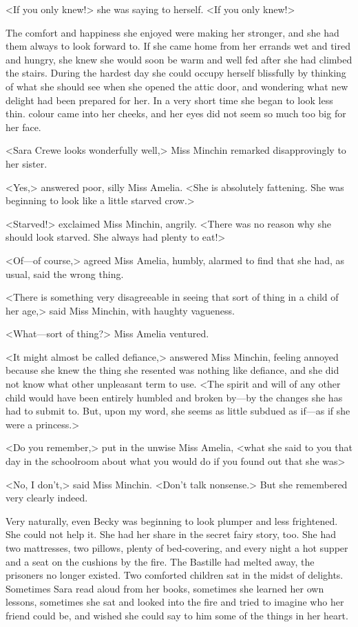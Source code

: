 <If you only knew!> she was saying to herself. <If you only knew!>

The comfort and happiness she enjoyed were making her stronger, and she had them always to look forward to. If she came home from her errands wet and tired and hungry, she knew she would soon be warm and well fed after she had climbed the stairs. During the hardest day she could occupy herself blissfully by thinking of what she should see when she opened the attic door, and wondering what new delight had been prepared for her. In a very short time she began to look less thin. colour came into her cheeks, and her eyes did not seem so much too big for her face.

<Sara Crewe looks wonderfully well,> Miss Minchin remarked disapprovingly to her sister.

<Yes,> answered poor, silly Miss Amelia. <She is absolutely fattening. She was beginning to look like a little starved crow.>

<Starved!> exclaimed Miss Minchin, angrily. <There was no reason why she should look starved. She always had plenty to eat!>

<Of—of course,> agreed Miss Amelia, humbly, alarmed to find that she had, as usual, said the wrong thing.

<There is something very disagreeable in seeing that sort of thing in a child of her age,> said Miss Minchin, with haughty vagueness.

<What—sort of thing?> Miss Amelia ventured.

<It might almost be called defiance,> answered Miss Minchin, feeling annoyed because she knew the thing she resented was nothing like defiance, and she did not know what other unpleasant term to use. <The spirit and will of any other child would have been entirely humbled and broken by—by the changes she has had to submit to. But, upon my word, she seems as little subdued as if—as if she were a princess.>

<Do you remember,> put in the unwise Miss Amelia, <what she said to you that day in the schoolroom about what you would do if you found out that she was\longdash>

<No, I don't,> said Miss Minchin. <Don't talk nonsense.> But she remembered very clearly indeed.

Very naturally, even Becky was beginning to look plumper and less frightened. She could not help it. She had her share in the secret fairy story, too. She had two mattresses, two pillows, plenty of bed-covering, and every night a hot supper and a seat on the cushions by the fire. The Bastille had melted away, the prisoners no longer existed. Two comforted children sat in the midst of delights. Sometimes Sara read aloud from her books, sometimes she learned her own lessons, sometimes she sat and looked into the fire and tried to imagine who her friend could be, and wished she could say to him some of the things in her heart.

